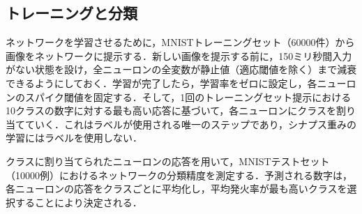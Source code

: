 \documentclass[a4paper, titlepage]{jsarticle}
\begin{document}
\subsection{トレーニングと分類}
ネットワークを学習させるために，MNISTトレーニングセット（60000件）から画像をネットワークに提示する．新しい画像を提示する前に，150ミリ秒間入力がない状態を設け，全ニューロンの全変数が静止値（適応閾値を除く）まで減衰できるようにしておく．学習が完了したら，学習率をゼロに設定し，各ニューロンのスパイク閾値を固定する．そして，1回のトレーニングセット提示における10クラスの数字に対する最も高い応答に基づいて，各ニューロンにクラスを割り当てていく．これはラベルが使用される唯一のステップであり，シナプス重みの学習にはラベルを使用しない．
\par
クラスに割り当てられたニューロンの応答を用いて，MNISTテストセット（10000例）におけるネットワークの分類精度を測定する．予測される数字は，各ニューロンの応答をクラスごとに平均化し，平均発火率が最も高いクラスを選択することにより決定される．
\end{document}
